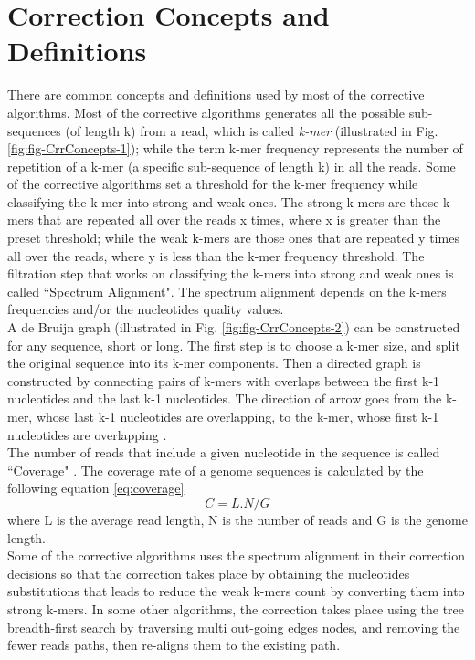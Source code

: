 \documentclass[12pt,openany]{llncs}
\begin{document}
\section{Correction Concepts and Definitions}
There are common concepts and definitions used by most of the corrective algorithms. Most of the corrective algorithms generates all the possible sub-sequences (of length k) from a read, which is called \textit{k-mer} (illustrated in Fig. \ref{fig:fig-CrrConcepts-1}); while the term k-mer frequency represents the number of repetition of a k-mer (a specific sub-sequence of length k) in all the reads. Some of the corrective algorithms set a threshold for the k-mer frequency while classifying the k-mer into strong and weak ones. The strong k-mers are those k-mers that are repeated all over the reads x times, where x is greater than the preset threshold; while the weak k-mers are those ones that are repeated y times all over the reads, where y is less than the k-mer frequency threshold. The filtration step that works on classifying the k-mers into strong and weak ones is called ``Spectrum Alignment". The spectrum alignment depends on the k-mers frequencies and/or the nucleotides quality values.
\\
A de Bruijn graph (illustrated in Fig. \ref{fig:fig-CrrConcepts-2}) can be constructed for any sequence, short or long. The first step is to choose a k-mer size, and split the original sequence into its k-mer components. Then a directed graph is constructed by connecting pairs of k-mers with overlaps between the first k-1 nucleotides and the last k-1 nucleotides. The direction of arrow goes from the k-mer, whose last k-1 nucleotides are overlapping, to the k-mer, whose first k-1 nucleotides are overlapping \cite{deBruijn,deBruijn1}.
\\ 
The number of reads that include a given nucleotide in the sequence is called ``Coverage" \cite{coverage}. The coverage rate of a genome sequences is calculated by the following equation \ref{eq:coverage}
\begin{equation} \label{eq:coverage}
 C = L.N/G 
\end{equation}
where L is the average read length, N is the number of reads and G is the genome length.
\\
Some of the corrective algorithms uses the spectrum alignment in their correction decisions so that the correction takes place by obtaining the nucleotides substitutions that leads to reduce the weak k-mers count by converting them into strong k-mers.
In some other algorithms, the correction takes place using the tree breadth-first search by traversing multi out-going edges nodes, and removing the fewer reads paths, then re-aligns them to the existing path.
\end{document}
